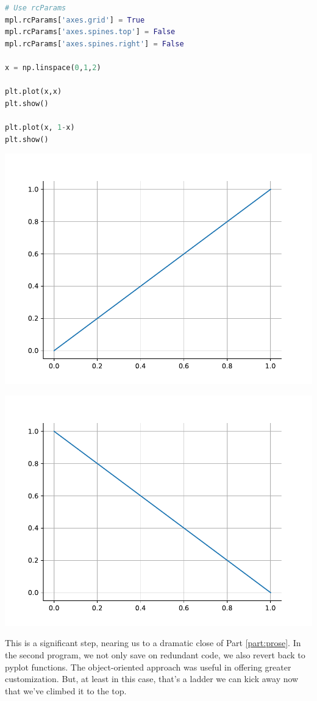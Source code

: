 \vspace{-0.3cm}
\begin{lstlisting}[language = Python]
# Use rcParams
mpl.rcParams['axes.grid'] = True
mpl.rcParams['axes.spines.top'] = False
mpl.rcParams['axes.spines.right'] = False

x = np.linspace(0,1,2)

plt.plot(x,x)
plt.show()

plt.plot(x, 1-x)
plt.show()
\end{lstlisting}
\vspace{-0.5cm}
\begin{center}
    \includegraphics[width = .7\textwidth]{Images/style1.pdf}
    
    \includegraphics[width = .7\textwidth]{Images/style2.pdf}
\end{center}


This is a significant step, nearing us to a dramatic close of Part \ref{part:prose}. In the second program, we not only save on redundant code, we also revert back to pyplot functions. The object-oriented approach was useful in offering greater customization. But, at least in this case, that's a ladder we can kick away now that we've climbed it to the top.  

